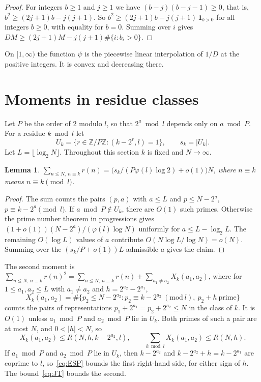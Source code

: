 \documentclass[11pt]{amsart}
\newtheorem{lemma}[theorem]{Lemma}
\theoremstyle{definition}
\theoremstyle{remark}
\numberwithin{equation}{section}
\begin{document}
\begin{proof}
For integers $b\ge1$ and $j\ge1$ we have $(b-j)(b-j-1)\ge0$, that is, $b^2\ge(2j+1)b-j(j+1)$. So $b^2\ge(2j+1)b-j(j+1)\,\mathbf 1_{b>0}$ for all integers $b\ge0$, with equality for $b=0$. Summing over $i$ gives $DM\ge(2j+1)M-j(j+1)\#\{i:b_i>0\}$.
\end{proof}

On $[1,\infty)$ the function $\psi$ is the piecewise linear interpolation of $1/D$ at the positive integers. It is convex and decreasing there.

\section{Moments in residue classes}\label{sec:moments}

Let $P$ be the order of $2$ modulo $l$, so that $2^a\bmod l$ depends only on $a\bmod P$. For a residue $k\bmod l$ let
\[
U_k=\{r\in\mathbb Z/P\mathbb Z:(k-2^r,l)=1\},\qquad s_k=|U_k|.
\]
Let $L=\lfloor\log_2N\rfloor$. Throughout this section $k$ is fixed and $N\to\infty$.

\begin{lemma}\label{lem:first}
$\sum_{n\le N,\ n\equiv k}r(n)=\bigl(s_k/(P\varphi(l)\log2)+o(1)\bigr)N$, where $n\equiv k$ means $n\equiv k\pmod l$.
\end{lemma}

\begin{proof}
The sum counts the pairs $(p,a)$ with $a\le L$ and $p\le N-2^a$, $p\equiv k-2^a\pmod l$. If $a\bmod P\notin U_k$, there are $O(1)$ such primes. Otherwise the prime number theorem in progressions gives $(1+o(1))(N-2^a)/(\varphi(l)\log N)$ uniformly for $a\le L-\log_2L$. The remaining $O(\log L)$ values of $a$ contribute $O(N\log L/\log N)=o(N)$. Summing over the $(s_k/P+o(1))L$ admissible $a$ gives the claim.
\end{proof}

The second moment is $\sum_{n\le N,\,n\equiv k}r(n)^2=\sum_{n\le N,\,n\equiv k}r(n)+\sum_{a_1\ne a_2}X_k(a_1,a_2)$, where for $1\le a_1,a_2\le L$ with $a_1\ne a_2$ and $h=2^{a_2}-2^{a_1}$,
\[
X_k(a_1,a_2)=\#\{p_2\le N-2^{a_2}:p_2\equiv k-2^{a_2}\ (\mathrm{mod}\ l),\ p_2+h\ \text{prime}\}
\]
counts the pairs of representations $p_1+2^{a_1}=p_2+2^{a_2}\le N$ in the class of $k$. It is $O(1)$ unless $a_1\bmod P$ and $a_2\bmod P$ lie in $U_k$. Both primes of such a pair are at most $N$, and $0<|h|<N$, so
\begin{equation}\label{eq:twobounds}
X_k(a_1,a_2)\le R(N,h,k-2^{a_2},l),\qquad\sum_{k\bmod l}X_k(a_1,a_2)\le R(N,h).
\end{equation}
If $a_1\bmod P$ and $a_2\bmod P$ lie in $U_k$, then $k-2^{a_2}$ and $k-2^{a_2}+h=k-2^{a_1}$ are coprime to $l$, so~\eqref{eq:ESP} bounds the first right-hand side, for either sign of $h$. The bound~\eqref{eq:JT} bounds the second.
\end{document}

